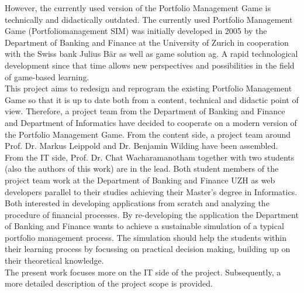However, the currently used version of the Portfolio Management Game is technically and didactically outdated. The currently used Portfolio Management Game (Portfoliomanagement SIM) was initially developed in 2005 by the Department of Banking and Finance at the University of Zurich in cooperation with the Swiss bank Julius Bär as well as game solution ag. A rapid technological development since that time allows new perspectives and possibilities in the field of game-based learning.\\


This project aims to redesign and reprogram the existing Portfolio Management Game so that it is up to date both from a content, technical and didactic point of view. Therefore, a project team from the Department of Banking and Finance and Department of Informatics have decided to cooperate on a modern version of the Portfolio Management Game. From the content side, a project team around Prof. Dr. Markus Leippold and Dr. Benjamin Wilding have been assembled. From the IT side, Prof. Dr. Chat Wacharamanotham together with two students (also the authors of this work) are in the lead. Both student members of the project team work at the Department of Banking and Finance UZH as web developers parallel to their studies achieving their Master’s degree in Informatics. Both interested in developing applications from scratch and analyzing the procedure of financial processes. By re-developing the application the Department of Banking and Finance wants to achieve a sustainable simulation of a typical portfolio management process. The simulation should help the students within their learning process by focussing on practical decision making, building up on their theoretical knowledge. \\

The present work focuses more on the IT side of the project. Subsequently, a more detailed description of the project scope is provided.
